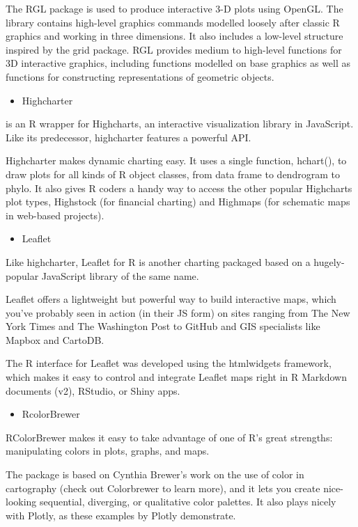 \documentclass[
]{report}
\providecommand{\tightlist}{%
  \setlength{\itemsep}{0pt}\setlength{\parskip}{0pt}}
\begin{document}
The RGL package is used to produce interactive 3-D plots using OpenGL. The library contains high-level graphics commands modelled loosely after classic R graphics and working in three dimensions. It also includes a low-level structure inspired by the grid package. RGL provides medium to high-level functions for 3D interactive graphics, including functions modelled on base graphics as well as functions for constructing representations of geometric objects.

\begin{itemize}
\tightlist
\item
  Highcharter
\end{itemize}

is an R wrapper for Highcharts, an interactive visualization library in JavaScript. Like its predecessor, highcharter features a powerful API.

Highcharter makes dynamic charting easy. It uses a single function, hchart(), to draw plots for all kinds of R object classes, from data frame to dendrogram to phylo. It also gives R coders a handy way to access the other popular Highcharts plot types, Highstock (for financial charting) and Highmaps (for schematic maps in web-based projects).

\begin{itemize}
\tightlist
\item
  Leaflet
\end{itemize}

Like highcharter, Leaflet for R is another charting packaged based on a hugely-popular JavaScript library of the same name.

Leaflet offers a lightweight but powerful way to build interactive maps, which you've probably seen in action (in their JS form) on sites ranging from The New York Times and The Washington Post to GitHub and GIS specialists like Mapbox and CartoDB.

The R interface for Leaflet was developed using the htmlwidgets framework, which makes it easy to control and integrate Leaflet maps right in R Markdown documents (v2), RStudio, or Shiny apps.

\begin{itemize}
\tightlist
\item
  RcolorBrewer
\end{itemize}

RColorBrewer makes it easy to take advantage of one of R's great strengths: manipulating colors in plots, graphs, and maps.

The package is based on Cynthia Brewer's work on the use of color in cartography (check out Colorbrewer to learn more), and it lets you create nice-looking sequential, diverging, or qualitative color palettes. It also plays nicely with Plotly, as these examples by Plotly demonstrate.
\end{document}
